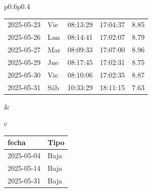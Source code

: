 \documentclass[11pt,a4paper]{article}
\newcommand{\infobox}[2]{
  \begin{tcolorbox}[
    colback=grisclaro,
    colframe=corporativo,
    title=#1,
    fonttitle=\bfseries
  ]
#2
  \end{tcolorbox}
}
\begin{document}
\begin{tabular}{p{}p{}}
{\begin{tabular}{p{2cm} p{0.6cm} p{1.2cm} p{1.2cm} r}
2025-05-23 & Vie & 08:13:29 & 17:04:37 &8.85\\
\rowcolor{white}%
2025-05-26 & Lun & 08:14:41 & 17:02:07 &8.79\\
\rowcolor{white}%
2025-05-27 & Mar & 08:09:33 & 17:07:00 &8.96\\
\rowcolor{white}%
2025-05-29 & Jue & 08:17:45 & 17:02:31 &8.75\\
\rowcolor{white}%
2025-05-30 & Vie & 08:10:06 & 17:02:35 &8.87\\
\rowcolor{white}%
\rowcolor{corporativo!20}
 2025-05-31  &  Sáb  &  10:33:29  &  18:11:15  &%
         7.63\\

\bottomrule
\end{tabular}
}
&
\begin{tabular}{c}

\infobox{D\'ias At\'ipicos}{
\begin{tabular}{p{2cm} p{2cm}}
\toprule
\rowcolor{grisclaro} \textbf{fecha} & \textbf{Tipo}\\
\midrule

2025-05-04 & Baja\\

2025-05-14 & Baja\\

2025-05-31 & Baja\\

\bottomrule
\end{tabular}
}
\\
\\




    

    
        
    

    

    

    

    

    

    

    

    

    

    

    


\end{tabular}
\end{tabular}
\end{document}
